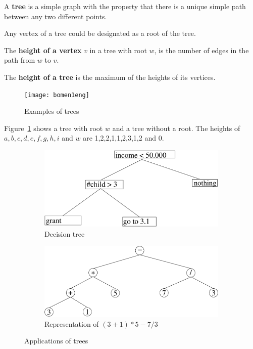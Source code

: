  \begin{definition}[Tree]
  \textup{ A \textbf{tree} is a simple graph with the property that
there is a unique simple path between any two different points. }
\end{definition}

Any vertex of a tree could be designated as a root of the tree.

 \begin{definition}
  \textup{
The
 \textbf{height of a vertex} $v$ in a tree with root
    $w$, is the number of edges in the path from $w$ to $v$. }
\end{definition}

 \begin{definition}
  \textup{
The
\textbf{height of a tree} is the maximum of the heights of its vertices.}
\end{definition}

\begin{figure}[ht]
	\centering
	\texttt{[image: bomen1eng]}
	\caption{Examples of trees \label{bomen1}}
\end{figure}


Figure~\ref{bomen1} shows a tree with root $w$ and a tree without a
root. The heights of $a,b,c,d,e,f,g,h,i$ and $w$ are 1,2,2,1,1,2,3,1,2
and 0.

\begin{figure}[ht]
	\centering
	\begin{subfigure}{0.45\linewidth}
		\centering
		\includegraphics[width=\linewidth,keepaspectratio]{decisiontree1eng}
		\caption{Decision tree}
		\label{decisiontree1}	
	\end{subfigure}\qquad
	\begin{subfigure}{0.45\linewidth}
		\centering
		\includegraphics[width=\linewidth,keepaspectratio]{expr1}
		\caption{Representation of $(3+1) *5 - 7/3$}
		\label{expr1}
	\end{subfigure}
	\caption{Applications of trees}
\end{figure}

